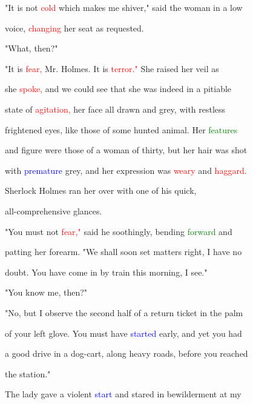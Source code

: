  "It is not \textcolor{red}{cold} which makes me \textcolor{BurntOrange}{shiver,"} said the woman in a low

 voice, \textcolor{red}{changing} her seat as requested.



 "What, then?"



 "It is \textcolor{red}{fear,} Mr. Holmes. It is \textcolor{red}{terror."} She raised her veil as

 she \textcolor{red}{spoke,} and we could see that she was indeed in a pitiable

 state of \textcolor{red}{agitation,} her face all drawn and grey, with restless

 \textcolor{BurntOrange}{frightened} eyes, like those of some hunted animal. Her \textcolor{green}{features}

 and figure were those of a woman of thirty, but her hair was \textcolor{BurntOrange}{shot}

 with \textcolor{blue}{premature} grey, and her expression was \textcolor{red}{weary} and \textcolor{red}{haggard.}

 Sherlock Holmes ran her over with one of his quick,

 all-comprehensive glances.



 "You must not \textcolor{red}{fear,"} said he soothingly, bending \textcolor{green}{forward} and

 patting her \textcolor{BurntOrange}{forearm.} "We shall soon set matters right, I have no

 \textcolor{BurntOrange}{doubt.} You have come in by train this morning, I see."



 "You know me, then?"



 "No, but I observe the second half of a return ticket in the palm

 of your left glove. You must have \textcolor{blue}{started} early, and yet you had

 a \textcolor{BurntOrange}{good} drive in a dog-cart, along heavy roads, before you reached

 the station."



 The lady gave a \textcolor{BurntOrange}{violent} \textcolor{blue}{start} and \textcolor{BurntOrange}{stared} in \textcolor{BurntOrange}{bewilderment} at my

